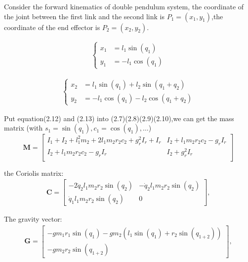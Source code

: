    Consider the forward kinematics of double pendulum system, the coordinate of the joint between the first link and the second link is \(P_1=(x_1,y_1)\),the coordinate of the end effector is \(P_2=(x_2,y_2)\).

    \begin{align}
        \label{eq:first_set}
        \left\{
        \begin{aligned}
        x_1 &= l_1 \sin(q_1) \\
        y_1 &= - l_1 \cos(q_1)
        \end{aligned}
        \right.
    \end{align}

    \begin{align}
        \label{eq:second_set}
        \left\{
        \begin{aligned}
        x_2 &= l_1 \sin(q_1) + l_2 \sin(q_1 + q_2) \\
        y_2 &= -l_1 \cos(q_1) - l_2 \cos(q_1 + q_2)
        \end{aligned}
        \right.
    \end{align}

    Put equation(2.12) and (2.13) into (2.7)(2.8)(2.9)(2.10),we can get the mass matrix (with \(s_1 = \sin(q_1), c_1 = \cos(q_1), \ldots\))
    \begin{equation}
    \mathbf{M} =
    \left[ 
    {\begin{array}{cc}
    I_1 + I_2 + l_1^2m_2 + 2l_1m_2r_2c_2 + g_r^2I_r + I_r  &   I_2 + l_1m_2r_2c_2 - g_rI_r  \\
    I_2 + l_1m_2r_2c_2 - g_rI_r                    & I_2 + g_r^2I_r                       \\
    \end{array}} 
    \right]
    \end{equation}
    
    the Coriolis matrix:
    \begin{equation}
    \begin{split}
    \mathbf{C} = \left[
    \begin{matrix}
    -2 \dot{q}_2 l_{1} m_{2} r_{2} \sin(q_2) & -\dot{q}_2 l_{1} m_{2} r_{2} \sin(q_2)\\
    \dot{q}_1 l_{1} m_{2} r_{2} \sin(q_2) & 0
    \end{matrix}
    \right],
    \label{eq:coriolis_matrix}
    \end{split}
    \end{equation}
    
    The gravity vector:
    \begin{equation}
    \begin{split}
    \mathbf{G} = \left[
    \begin{matrix}
    - g m_{1} r_{1} \sin(q_1) - g m_{2} \left(l_{1} \sin(q_1) + r_{2} \sin(q_{1+2}) \right) \\
    - g m_{2} r_{2} \sin(q_{1+2})
    \end{matrix}
    \right],
    \label{eq:gravity_matrix}
    \end{split}
    \end{equation}
    
